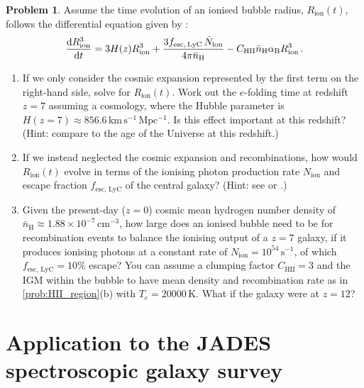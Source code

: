\documentclass{article}
\theoremstyle{definition}
\newtheorem{problem}{Problem}[section]
\begin{document}
\begin{problem}
    \label{prob:bubble_radius_evolution}
    Assume the time evolution of an ionised bubble radius, $R_\text{ion}(t)$, follows the differential equation given by \citet{2000ApJ...542L..75C}:
    \begin{equation}
        \frac{\dif R_\mathrm{ion}^3}{\dif t} = 3 H(z) R_\mathrm{ion}^3 + \frac{3 f_\mathrm{esc, \, LyC} \, \dot{N}_\mathrm{ion}}{4\pi \bar{n}_\mathrm{H}} - C_\mathrm{HII} \bar{n}_\mathrm{H} \alpha_\mathrm{B} R_\mathrm{ion}^3 \, .
    \end{equation}
    \begin{enumerate}[label=(\alph*)]
        \item If we only consider the cosmic expansion represented by the first term on the right-hand side, solve for $R_\text{ion}(t)$. Work out the $e$-folding time at redshift $z = 7$ assuming a \citet{2020A&A...641A...6P} cosmology, where the Hubble parameter is $H(z=7) \approx 856.6 \, \mathrm{km \, s^{-1} \, Mpc^{-1}}$. Is this effect important at this redshift? (Hint: compare to the age of the Universe at this redshift.)
        \item If we instead neglected the cosmic expansion and recombinations, how would $R_\text{ion}(t)$ evolve in terms of the ionising photon production rate $N_\text{ion}$ and escape fraction $f_\text{esc, LyC}$ of the central galaxy? (Hint: see \citet{2020MNRAS.499.1395M} or \citet{2024A&A...682A..40W}.)
        \item Given the present-day ($z = 0$) cosmic mean hydrogen number density of $\bar{n}_\text{H} \approx 1.88 \times 10^{-7} \, \mathrm{cm^{-3}}$, how large does an ionised bubble need to be for recombination events to balance the ionising output of a $z = 7$ galaxy, if it produces ionising photons at a constant rate of $N_\text{ion} = 10^{54} \, \mathrm{s^{-1}}$, of which $f_\text{esc, LyC} = 10\%$ escape? You can assume a clumping factor $C_\mathrm{HII} = 3$ and the IGM within the bubble to have mean density and recombination rate as in \cref{prob:HII_region}(b) with $T_e = \num{20000} \, \mathrm{K}$. What if the galaxy were at $z = 12$?
    \end{enumerate}
\end{problem}

\section{Application to the JADES spectroscopic galaxy survey}
\end{document}
